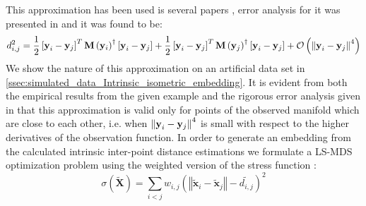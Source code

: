 	This approximation has been used is several papers \cite{dsilva2013nonlinear,dsilva2015data,dsilva2015parsimonious,duncan2013identifying,mishne2015graph,singer2008non,talmon2012parametrization,talmon2013empirical,talmon2015intrinsic,talmon2015manifold},
	error analysis for it was presented in \cite{dsilva2015data,singer2008non} and it was found to be:
	\[
	d_{i,j}^{2}=\frac{1}{2}\left[\text{\ensuremath{\mathbf{y}}}_{i}-\mathbf{y}_{j}\right]^{T}\mathbf{M}\left({\bf y}_{i}\right)^{\dagger}\left[\text{\ensuremath{\mathbf{y}}}_{i}-\mathbf{y}_{j}\right]+\frac{1}{2}\left[\text{\ensuremath{\mathbf{y}}}_{i}-\mathbf{y}_{j}\right]^{T}\mathbf{M}\left({\bf y}_{j}\right)^{\dagger}\left[\text{\ensuremath{\mathbf{y}}}_{i}-\mathbf{y}_{j}\right]+\ensuremath{\mathcal{O}}\left(\left\Vert \text{\ensuremath{\mathbf{y}}}_{i}-\mathbf{y}_{j}\right\Vert ^{4}\right)
	\]
	We show the nature of this approximation on an artificial data set in \cref{ssec:simulated_data_Intrinsic_isometric_embedding}. It is evident from both the empirical results from the given example and the rigorous error analysis given in \cite{dsilva2015data} that this approximation is valid only for points of the observed manifold which are close to each other, i.e. when $\left\Vert\text{\ensuremath{\mathbf{y}}}_{i}-\mathbf{y}_{j}\right\Vert ^{4}$ is small with respect to the higher derivatives of the observation function. In order to generate an embedding from the calculated intrinsic inter-point distance estimations we formulate a \ac{LS-MDS} optimization problem using the weighted version of the stress function :
	\begin{equation}
	\sigma\left(\widetilde{\mathbf{X}}\right)=\sum_{i<j}w_{i,j}\left(\left\Vert \mathbf{\widetilde{x}}_{i}-\mathbf{\widetilde{x}}_{j}\right\Vert -\tilde{d_{i,j}}\right)^{2}\label{eq:w-intrinisc_stress}
	\end{equation}
